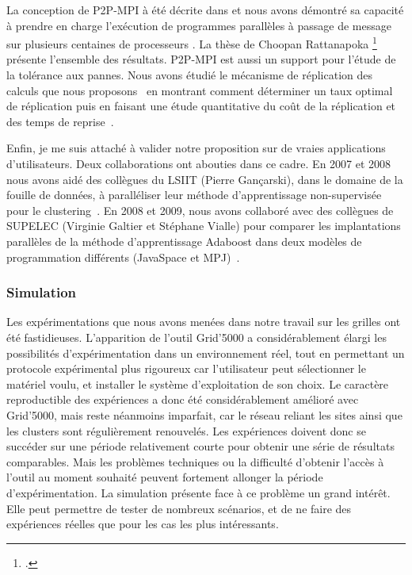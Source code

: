 \documentclass[11pt]{article}
\newcommand{\pmpi}{\mbox{\textsc{P2P-MPI}}}
\begin{document}
La conception de {\pmpi} à été décrite dans \cite{icps-2007-182,icps-2005-155} et nous avons démontré
sa capacité à prendre en charge l'exécution de programmes parallèles à passage de message sur plusieurs
centaines de processeurs \cite{icps-2008-193}. La thèse de Choopan Rattanapoka \footcite{icps-2008-208} 
présente l'ensemble des résultats.
{\pmpi} est aussi un support pour l'étude de la tolérance aux pannes. Nous avons étudié le mécanisme 
de réplication des calculs que nous proposons~\cite{icps-2007-185} en montrant comment déterminer 
un taux optimal de réplication \cite{icps-2009-217} puis en faisant une étude quantitative du 
coût de la réplication et des temps de reprise~\cite{icps-2009-214}.

Enfin, je me suis attaché à valider notre proposition sur de vraies applications d'utilisateurs.
Deux collaborations ont abouties dans ce cadre. En 2007 et 2008 nous avons aidé des collègues 
du LSIIT (Pierre Gançarski), dans le domaine de la fouille de données, à paralléliser leur 
méthode d'apprentissage non-supervisée pour le clustering~\cite{icps-2008-188}. 
En 2008 et 2009, nous avons collaboré avec des collègues de SUPELEC (Virginie Galtier et
Stéphane Vialle) pour comparer
les implantations parallèles de la méthode d'apprentissage Adaboost dans deux modèles
de programmation différents (JavaSpace et MPJ)~\cite{icps-2009-219}.


\subsubsection{Simulation}
\label{sc:simulation}

Les expérimentations que nous avons menées dans notre travail sur les grilles 
ont été fastidieuses. L'apparition de l'outil Grid'5000 a considérablement
élargi les possibilités d'expérimentation dans un environnement réel, tout
en permettant un protocole expérimental plus rigoureux car l'utilisateur
peut sélectionner le matériel voulu, et installer le système d'exploitation de
son choix. Le caractère reproductible des expériences a donc été considérablement
amélioré avec Grid'5000, mais reste néanmoins imparfait, car le
réseau reliant les sites ainsi que les clusters sont régulièrement renouvelés.
Les expériences doivent donc se succéder sur une période relativement courte
pour obtenir une série de résultats comparables. Mais les problèmes techniques
ou la difficulté d'obtenir l'accès à l'outil au moment souhaité peuvent fortement 
allonger la période d'expérimentation.
La simulation présente face à ce problème un grand intérêt. Elle peut permettre
de tester de nombreux scénarios, et de ne faire des expériences réelles que pour
les cas les plus intéressants.\\
\end{document}
